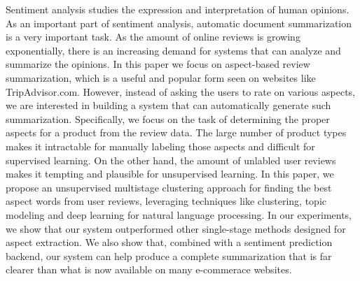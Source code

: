 \begin{englishabstract}
Sentiment analysis studies the expression and interpretation of human opinions. As an important part of sentiment analysis, automatic document summarization is a very important task. As the amount of online reviews is growing exponentially, there is an increasing demand for systems that can analyze and summarize the opinions. In this paper we focus on aspect-based review summarization, which is a useful and popular form seen on websites like TripAdvisor.com. However, instead of asking the users to rate on various aspects, we are interested in building a system that can automatically generate such summarization. Specifically, we focus on the task of determining the proper aspects for a product from the review data. The large number of product types makes it intractable for manually labeling those aspects and difficult for supervised learning. On the other hand, the amount of unlabled user reviews makes it tempting and plausible for unsupervised learning. In this paper, we propose an unsupervised multistage clustering approach for finding the best aspect words from user reviews, leveraging techniques like clustering, topic modeling and deep learning for natural language processing. In our experiments, we show that our system outperformed other single-stage methods designed for aspect extraction. We also show that, combined with a sentiment prediction backend, our system can help produce a complete summarization that is far clearer than what is now available on many e-commerace websites.


\end{englishabstract}
